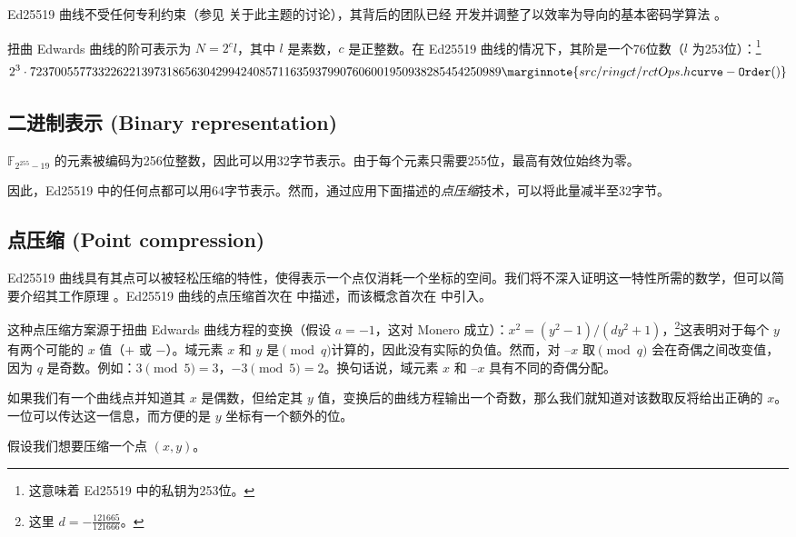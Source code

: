 Ed25519 曲线不受任何专利约束（参见 \cite{ECC-patents} 关于此主题的讨论），其背后的团队已经
开发并调整了以效率为导向的基本密码学算法 \cite{Bernstein2007}。

扭曲 Edwards 曲线的阶可表示为 \(N=2^c l\)，其中 \(l\) 是素数，\(c\) 是正整数。在 Ed25519 曲线的情况下，其阶是一个76位数（$l$ 为253位）：\footnote{这意味着 Ed25519 中的私钥为253位。}\vspace{.175cm}
\[2^3 \cdot 7237005577332262213973186563042994240857116359379907606001950938285454250989\marginnote{src/ringct/ rctOps.h {\tt curve- Order()}}\]


\subsection{二进制表示 (Binary representation)}
\label{binary_note}
\(\mathbb{F}_{2^{255} - 19} \) 的元素被编码为256位整数，因此可以用32字节表示。由于每个元素只需要255位，最高有效位始终为零。

因此，Ed25519 中的任何点都可以用64字节表示。然而，通过应用下面描述的{\em 点压缩}技术，可以将此量减半至32字节。


\subsection{点压缩 (Point compression)}
\label{point_compression_section}

Ed25519 曲线具有其点可以被轻松压缩的特性，使得表示一个点仅消耗一个坐标的空间。我们将不深入证明这一特性所需的数学，但可以简要介绍其工作原理 \cite{eddsa-ed25519-irtf}。Ed25519 曲线的点压缩首次在 \cite{Bernstein2012} 中描述，而该概念首次在 \cite{Miller:point-compression-origin} 中引入。

这种点压缩方案源于扭曲 Edwards 曲线方程的变换（假设 $a = -1$，这对 Monero 成立）：$x^2 = (y^2-1)/(d y^2+1)$，\footnote{这里 $d = - \frac{121665}{121666}$。}这表明对于每个 $y$ 有两个可能的 $x$ 值（$+$ 或 $-$）。域元素 $x$ 和 $y$ 是$\pmod{q}$计算的，因此没有实际的负值。然而，对 $–x$ 取$\pmod{q}$ 会在奇偶之间改变值，因为 $q$ 是奇数。例如：$3 \pmod{5} = 3$，$-3 \pmod{5} = 2$。换句话说，域元素 $x$ 和 $–x$ 具有不同的奇偶分配。

如果我们有一个曲线点并知道其 $x$ 是偶数，但给定其 $y$ 值，变换后的曲线方程输出一个奇数，那么我们就知道对该数取反将给出正确的 $x$。一位可以传达这一信息，而方便的是 $y$ 坐标有一个额外的位。

假设我们想要压缩一个点 \((x, y)\)。


